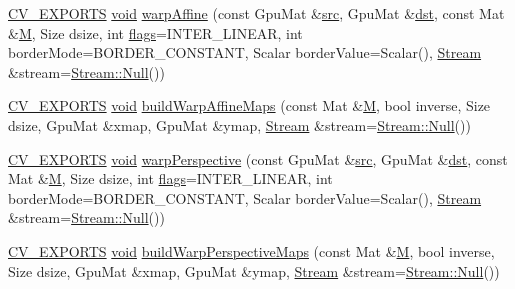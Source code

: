 \begin{DoxyCompactItemize}
\item 
\hyperlink{core_2types__c_8h_a1bf9f0e121b54272da02379cfccd0a2b}{C\-V\-\_\-\-E\-X\-P\-O\-R\-T\-S} \hyperlink{legacy_8hpp_a8bb47f092d473522721002c86c13b94e}{void} \hyperlink{namespacecv_1_1gpu_ade9767f511c582ee0e024a081afd946c}{warp\-Affine} (const Gpu\-Mat \&\hyperlink{legacy_8hpp_a371cd109b74033bc4366f584edd3dacc}{src}, Gpu\-Mat \&\hyperlink{photo__c_8h_aed13e2a25279b24dc954073233fef7a5}{dst}, const Mat \&\hyperlink{tracking_8hpp_aa81fa9fd378ecf463757e9274a136e70}{M}, Size dsize, int \hyperlink{highgui__c_8h_ae51e3a2d4365e85db9630dd3ce9508db}{flags}=I\-N\-T\-E\-R\-\_\-\-L\-I\-N\-E\-A\-R, int border\-Mode=B\-O\-R\-D\-E\-R\-\_\-\-C\-O\-N\-S\-T\-A\-N\-T, Scalar border\-Value=Scalar(), \hyperlink{classcv_1_1gpu_1_1Stream}{Stream} \&stream=\hyperlink{classcv_1_1gpu_1_1Stream_af96c23564834f88333dcb8997df553f1}{Stream\-::\-Null}())
\item 
\hyperlink{core_2types__c_8h_a1bf9f0e121b54272da02379cfccd0a2b}{C\-V\-\_\-\-E\-X\-P\-O\-R\-T\-S} \hyperlink{legacy_8hpp_a8bb47f092d473522721002c86c13b94e}{void} \hyperlink{namespacecv_1_1gpu_ac0fee3d77db35b68c7e9e151095fcab5}{build\-Warp\-Affine\-Maps} (const Mat \&\hyperlink{tracking_8hpp_aa81fa9fd378ecf463757e9274a136e70}{M}, bool inverse, Size dsize, Gpu\-Mat \&xmap, Gpu\-Mat \&ymap, \hyperlink{classcv_1_1gpu_1_1Stream}{Stream} \&stream=\hyperlink{classcv_1_1gpu_1_1Stream_af96c23564834f88333dcb8997df553f1}{Stream\-::\-Null}())
\item 
\hyperlink{core_2types__c_8h_a1bf9f0e121b54272da02379cfccd0a2b}{C\-V\-\_\-\-E\-X\-P\-O\-R\-T\-S} \hyperlink{legacy_8hpp_a8bb47f092d473522721002c86c13b94e}{void} \hyperlink{namespacecv_1_1gpu_a7278d07b1e25c1e29d4716f955ea2ab7}{warp\-Perspective} (const Gpu\-Mat \&\hyperlink{legacy_8hpp_a371cd109b74033bc4366f584edd3dacc}{src}, Gpu\-Mat \&\hyperlink{photo__c_8h_aed13e2a25279b24dc954073233fef7a5}{dst}, const Mat \&\hyperlink{tracking_8hpp_aa81fa9fd378ecf463757e9274a136e70}{M}, Size dsize, int \hyperlink{highgui__c_8h_ae51e3a2d4365e85db9630dd3ce9508db}{flags}=I\-N\-T\-E\-R\-\_\-\-L\-I\-N\-E\-A\-R, int border\-Mode=B\-O\-R\-D\-E\-R\-\_\-\-C\-O\-N\-S\-T\-A\-N\-T, Scalar border\-Value=Scalar(), \hyperlink{classcv_1_1gpu_1_1Stream}{Stream} \&stream=\hyperlink{classcv_1_1gpu_1_1Stream_af96c23564834f88333dcb8997df553f1}{Stream\-::\-Null}())
\item 
\hyperlink{core_2types__c_8h_a1bf9f0e121b54272da02379cfccd0a2b}{C\-V\-\_\-\-E\-X\-P\-O\-R\-T\-S} \hyperlink{legacy_8hpp_a8bb47f092d473522721002c86c13b94e}{void} \hyperlink{namespacecv_1_1gpu_a9f33a63ee99d5b520cd9b8418f58bdd0}{build\-Warp\-Perspective\-Maps} (const Mat \&\hyperlink{tracking_8hpp_aa81fa9fd378ecf463757e9274a136e70}{M}, bool inverse, Size dsize, Gpu\-Mat \&xmap, Gpu\-Mat \&ymap, \hyperlink{classcv_1_1gpu_1_1Stream}{Stream} \&stream=\hyperlink{classcv_1_1gpu_1_1Stream_af96c23564834f88333dcb8997df553f1}{Stream\-::\-Null}())

\end{DoxyCompactItemize}
